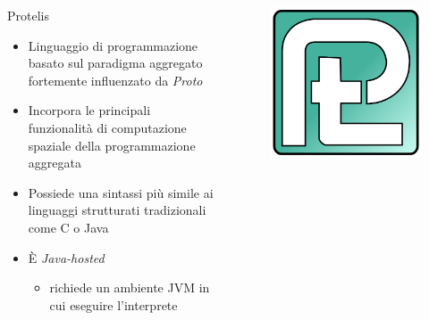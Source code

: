       \begin{frame}{\insertsectionhead}{\insertsubsectionhead}
        \begin{columns}
          \begin{column}{.8\textwidth}
            \begin{block}{Protelis}
              \begin{itemize}[<+->]
              \item
                  Linguaggio di programmazione basato sul paradigma aggregato fortemente influenzato da \emph{Proto}
                \item
                  Incorpora le principali funzionalità di computazione spaziale della programmazione aggregata
                \item
                  Possiede una sintassi più simile ai linguaggi strutturati tradizionali come C o Java
                \item
                  È \emph{Java-hosted}
                  \begin{itemize}
                    \item richiede un ambiente JVM in cui eseguire l'interprete
                  \end{itemize}
              \end{itemize}
            \end{block}
          \end{column}
          \begin{column}{.15\textwidth}
            \begin{figure}
              \includegraphics[width=\textwidth]{../res/fig/protelis-logo.png}
            \end{figure}
          \end{column}
        \end{columns}
      \end{frame}

